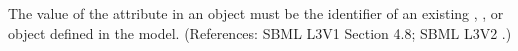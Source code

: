 The value of the attribute  in an \InitialAssignment object
must be the identifier of an existing \Compartment, \Species,
\Parameter or \SpeciesReference object defined in the model.  (References:
SBML L3V1 Section 4.8; SBML L3V2 .)
